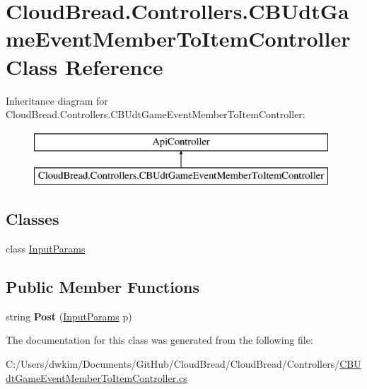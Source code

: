 \hypertarget{a00058}{}\section{Cloud\+Bread.\+Controllers.\+C\+B\+Udt\+Game\+Event\+Member\+To\+Item\+Controller Class Reference}
\label{a00058}
Inheritance diagram for Cloud\+Bread.\+Controllers.\+C\+B\+Udt\+Game\+Event\+Member\+To\+Item\+Controller\+:\begin{figure}[H]
\begin{center}
\leavevmode
\includegraphics[height=2.000000cm]{a00058}
\end{center}
\end{figure}
\subsection*{Classes}
\begin{DoxyCompactItemize}
\item 
class \hyperlink{a00108}{Input\+Params}
\end{DoxyCompactItemize}
\subsection*{Public Member Functions}
\begin{DoxyCompactItemize}
\item 
string {\bfseries Post} (\hyperlink{a00108}{Input\+Params} p)\hypertarget{a00058_a73e753cbb46954f8b32235ccb000f347}{}\label{a00058_a73e753cbb46954f8b32235ccb000f347}

\end{DoxyCompactItemize}


The documentation for this class was generated from the following file\+:\begin{DoxyCompactItemize}
\item 
C\+:/\+Users/dwkim/\+Documents/\+Git\+Hub/\+Cloud\+Bread/\+Cloud\+Bread/\+Controllers/\hyperlink{a00229}{C\+B\+Udt\+Game\+Event\+Member\+To\+Item\+Controller.\+cs}\end{DoxyCompactItemize}
